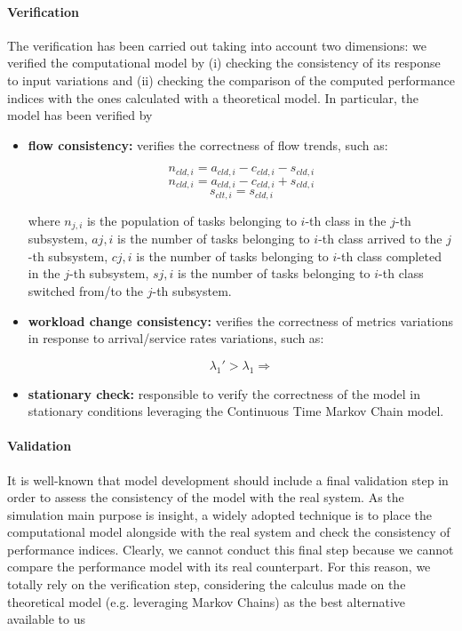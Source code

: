 \paragraph{Verification}
The verification has been carried out taking into account two dimensions: we verified the computational model by (i) checking the consistency of its response to input variations and (ii) checking the comparison of the computed performance indices with the ones calculated with a theoretical model.
%
In particular, the model has been verified by 
\begin{itemize}
	\item \textbf{flow consistency:} verifies the correctness of flow trends, such as:
	
	\begin{equation}
	n_{cld,i}=a_{cld,i}-c_{cld,i}-s_{cld,i}
	\end{equation}
	\begin{equation}
	n_{cld,i}=a_{cld,i}-c_{cld,i}+s_{cld,i}
	\end{equation}
	\begin{equation}
	s_{clt,i}=s_{cld,i}
	\end{equation}
	
	where 
	$n_{j,i}$ is the population of tasks belonging to $i$-th class in the $j$-th subsystem, 
	$a{j,i}$ is the number of tasks belonging to $i$-th class arrived to the $j$-th subsystem, 
	$c{j,i}$ is the number of tasks belonging to $i$-th class completed in the $j$-th subsystem, 
	$s{j,i}$ is the number of tasks belonging to $i$-th class switched from/to the $j$-th subsystem.
	 
	\item \textbf{workload change consistency:} verifies the correctness of metrics variations in response to arrival/service rates variations, such as:
	
	\begin{equation}
		\lambda_{1}' > \lambda_{1} \Rightarrow
	\end{equation}
	
	\item \textbf{stationary check:} responsible to verify the correctness of the model in stationary conditions leveraging the Continuous Time Markov Chain model.
\end{itemize}

\paragraph{Validation}
It is well-known that model development should include a final validation step in order to assess the consistency of the model with the real system. 
%
As the simulation main purpose is insight, a widely adopted technique is to place the computational model alongside with the real system and check the consistency of performance indices.
%
Clearly, we cannot conduct this final step because we cannot compare the performance model with its real counterpart.
%
For this reason, we totally rely on the verification step, considering the calculus made on the theoretical model (e.g. leveraging Markov Chains) as the best alternative available to us